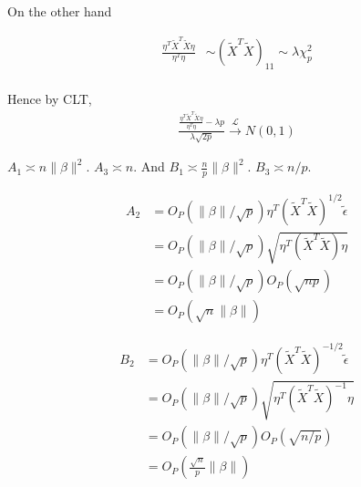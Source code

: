 \documentclass[review]{elsarticle}
\theoremstyle{plain}
\theoremstyle{definition}
\theoremstyle{remark}
\begin{document}
On the other hand

\begin{equation}
    \begin{aligned}
        \frac{\eta^T \tilde{X}^T\tilde{X} \eta    
        }{\eta^T\eta}&\sim {(\tilde{X}^T\tilde{X})}_{11}\sim \lambda \chi^2_{p}
\\
    \end{aligned}
\end{equation}

Hence by CLT,
\begin{equation}
    \begin{aligned}
        \frac{\frac{\eta^T \tilde{X}^T\tilde{X} \eta    
        }{\eta^T\eta}
    -\lambda p}{\lambda\sqrt{2p}
        }\xrightarrow{\mathcal{L}}N(0,1)
    \end{aligned}
\end{equation}


$A_1\asymp n\|\beta\|^2$. $A_3\asymp n$. And $B_1\asymp \frac{n}{p}\|\beta\|^2$. $B_3\asymp n/p$.

\begin{equation}
    \begin{aligned}
        A_2&=O_P(\|\beta\|/{\sqrt{p}})\eta^T {(\tilde{X}^T\tilde{X})}^{1/2}\tilde{\epsilon}\\
        &=O_P(\|\beta\|/\sqrt{p})\sqrt{\eta^T{(\tilde{X}^T\tilde{X})}\eta}\\
        &=O_P(\|\beta\|/\sqrt{p})O_P(\sqrt{np})\\
        &=O_P(\sqrt{n}\|\beta\|)
    \end{aligned}
\end{equation}

\begin{equation}
    \begin{aligned}
        B_2&=O_P(\|\beta\|/{\sqrt{p}})\eta^T {(\tilde{X}^T\tilde{X})}^{-1/2}\tilde{\epsilon}\\
        &=O_P(\|\beta\|/\sqrt{p})\sqrt{\eta^T{(\tilde{X}^T\tilde{X})}^{-1}\eta}\\
        &=O_P(\|\beta\|/\sqrt{p})O_P(\sqrt{n/p})\\
        &=O_P(\frac{\sqrt{n}}{p}\|\beta\|)
    \end{aligned}
\end{equation}
\end{document}
